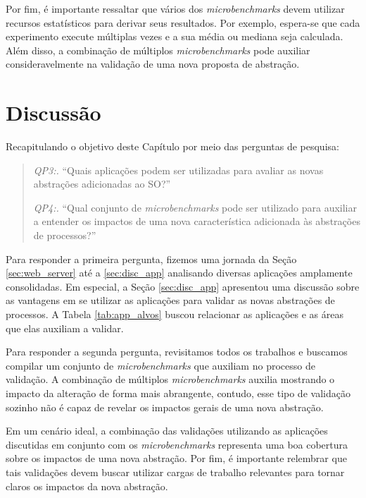 Por fim, é importante ressaltar que vários dos \emph{microbenchmarks} devem
utilizar recursos estatísticos para derivar seus resultados. Por exemplo,
espera-se que cada experimento execute múltiplas vezes e a sua média ou mediana
seja calculada. Além disso, a combinação de múltiplos \emph{microbenchmarks}
pode auxiliar consideravelmente na validação de uma nova proposta de abstração.

\section{Discussão}

Recapitulando o objetivo deste Capítulo por meio das perguntas de pesquisa:

\begin{quote}
  \item \emph{QP3:.} ``Quais aplicações podem ser utilizadas para avaliar as novas abstrações adicionadas ao SO?''
  \item \emph{QP4:.} ``Qual conjunto de \emph{microbenchmarks} pode ser utilizado para auxiliar a entender os impactos de uma nova característica adicionada às abstrações de processos?''
\end{quote}

Para responder a primeira pergunta, fizemos uma jornada da Seção
\ref{sec:web_server} até a \ref{sec:disc_app} analisando diversas aplicações
amplamente consolidadas. Em especial, a Seção \ref{sec:disc_app} apresentou uma
discussão sobre as vantagens em se utilizar as aplicações para validar as novas
abstrações de processos. A Tabela \ref{tab:app_alvos} buscou relacionar as
aplicações e as áreas que elas auxiliam a validar.

Para responder a segunda pergunta, revisitamos todos os trabalhos e buscamos
compilar um conjunto de \emph{microbenchmarks} que auxiliam no processo de
validação.  A combinação de múltiplos \emph{microbenchmarks} auxilia
mostrando o impacto da alteração de forma mais abrangente, contudo, esse tipo
de validação sozinho não é capaz de revelar os impactos gerais de uma nova
abstração.

Em um cenário ideal, a combinação das validações utilizando as aplicações
discutidas em conjunto com os \emph{microbenchmarks} representa uma boa
cobertura sobre os impactos de uma nova abstração. Por fim, é importante
relembrar que tais validações devem buscar utilizar cargas de trabalho
relevantes para tornar claros os impactos da nova abstração.
